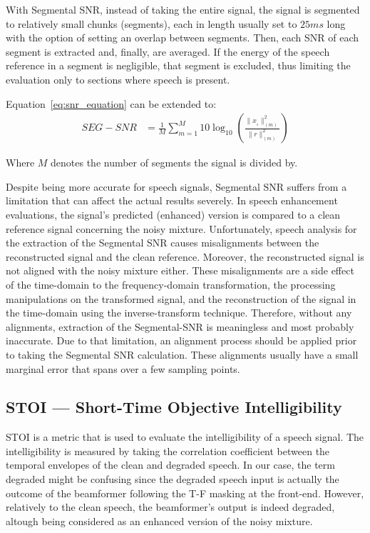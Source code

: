 With Segmental SNR\cite{10.5555/912256}, instead of taking the entire signal,
the signal is segmented to relatively small chunks (segments), 
each in length usually set to \(25ms\) long
with the option of setting an overlap
between segments.
Then, each SNR of each segment is extracted and, finally,
are averaged. 
If the energy of the speech reference 
in a segment is negligible, that segment is excluded,
thus limiting the evaluation only to sections 
where speech is present. 


Equation~\ref{eq:snr_equation} can be extended to:
\begin{align}
    SEG-SNR & = \frac{1}{M}\sum_{m=1}^{M}
                10\log_{10} 
                \left(
                    \frac{ \| x_{_{s}} \|^{2}_{(m)}}{\| r \|^{2}_{(m)}} 
                \right)
\end{align}

Where \(M\) denotes the number of segments the signal is divided by.


Despite being more accurate for speech signals, Segmental SNR 
suffers from a limitation that can affect the actual results severely. 
In speech enhancement evaluations, the signal's predicted (enhanced) version is 
compared to a clean reference signal 
concerning the noisy mixture.
Unfortunately, speech analysis for the extraction of
the Segmental SNR causes misalignments between 
the reconstructed signal and the clean reference. 
Moreover, the reconstructed signal is not aligned 
with the noisy mixture either. 
These misalignments 
are a side effect of the time-domain 
to the frequency-domain transformation, 
the processing manipulations on the transformed signal, 
and the reconstruction of the signal in 
the time-domain using the inverse-transform technique. 
Therefore, without any alignments, extraction of the Segmental-SNR
is meaningless and most probably inaccurate. 
Due to that limitation, an alignment process should be applied
prior to taking the Segmental SNR calculation. These alignments usually 
have a small marginal error that spans over a few sampling points.

\subsection{STOI --- Short-Time Objective Intelligibility}
STOI\cite{5495701} is a metric that is used to evaluate 
the intelligibility of a speech signal.
The intelligibility is measured by taking the correlation
coefficient between the temporal envelopes of the clean
and degraded speech. In our case, the term degraded might
be confusing since the degraded speech input
is actually the outcome of the beamformer
following the T-F masking at the front-end.
However, relatively to the clean speech, 
the beamformer's output is indeed degraded, altough
being considered as an enhanced version of the noisy mixture.

